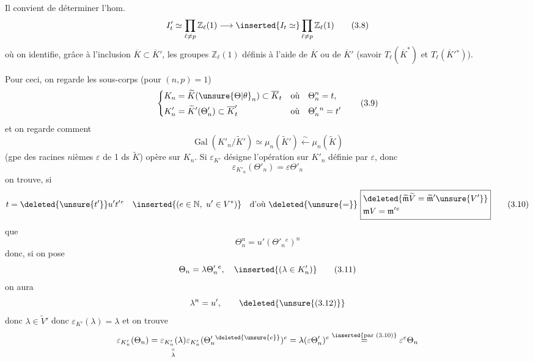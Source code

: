 Il convient de déterminer l'hom.
\[
I'_t\simeq\prod_{\ell\ne p}\mathbb Z_\ell(1)\longrightarrow\inserted{I_t\simeq}\prod_{\ell\ne p}\mathbb Z_\ell(1)\tag*{(3.8)}
\]
où on identifie, grâce à l'inclusion \(\overline K\subset\overline K'\), les  groupes \(\mathbb Z_\ell(1)\) définis à l'aide de \(\overline K\) ou de \(\overline K'\) (savoir \(T_\ell(\overline K^*)\) et \(T_\ell(\overline K'{}^*)\)).

Pour ceci, on regarde les sous-corps (pour \((n,p)=1\))
\[
\left\{\begin{aligned}
K_n&=\widetilde K(\unsure{\Theta|\theta}_n)\subset\overline K_t&\text{où}\quad&\Theta_n^n=t,\\
K'_n&=\widetilde K'(\Theta'_n)\subset\overline K'_t&\text{où}\quad&\Theta'_n{}^n=t'
\end{aligned}\right.\tag*{(3.9)}
\]
et on regarde comment
\[
\operatorname{Gal}(K'_n/\widetilde K')\simeq\mu_n(\widetilde K')\xleftarrow{\sim}\mu_n(\widetilde K)
\]
(gpe des racines \(n\)ièmes \(\varepsilon\) de 1 ds \(\widetilde K\)) opère sur \(K_n\). Si \(\varepsilon_{K'}\) désigne l'opération sur \(K'_n\) définie par \(\varepsilon\), donc
\[
\varepsilon_{K'_n}(\Theta'_n)=\varepsilon\Theta'_n
\]
on trouve, si
\[
t=\deleted{\unsure{t'}}u't'{}^e\quad\inserted{(e\in\mathbb N,\ u'\in V^*)}\quad
\text{d'où }\deleted{\unsure{=}}\ \boxed{\begin{aligned}&\deleted{\widetilde{\mathfrak m}\widetilde V=\widetilde{\mathfrak m}'\unsure{V'}}\\&\mathfrak m V=\mathfrak m'{}^e\end{aligned}}\tag*{(3.10)}
\]
que
\[
\Theta_n^n=u'(\Theta'_n{}^e)^n
\]
donc, si on pose
\[
\Theta_n=\lambda\Theta'_n{}^e,\quad\inserted{(\lambda\in K'_n)}\tag*{(3.11)}
\]
on aura
\[
\lambda^n=u',\tag*{\deleted{\unsure{(3.12)}}}
\]
donc  \(\lambda\in\widetilde V'\)  donc \(\varepsilon_{K'}(\lambda)=\lambda\) et on trouve
\[
\varepsilon_{K'_n}(\Theta_n)=\underset{\substack{\shortparallel\\\lambda}}{\varepsilon_{K'_n}(\lambda)}\varepsilon_{K'_n}(\Theta'_n{}^{\deleted{\unsure{e}}})^e=\lambda(\varepsilon\Theta'_n)^e\overset{\inserted{\text{par (3.10)}}}{=}\varepsilon^e\Theta_n
\]
